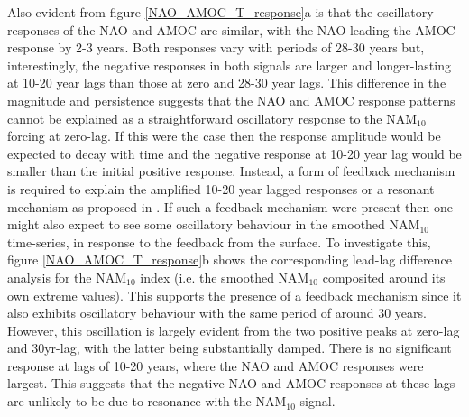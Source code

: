 Also evident from figure \ref{NAO_AMOC_T_response}a is that the oscillatory responses of the NAO and AMOC are similar, with the NAO leading the AMOC response by 2-3 years. Both responses vary with periods of 28-30 years but, interestingly, the negative responses in both signals are  larger and longer-lasting at 10-20 year lags than those at zero and 28-30 year lags. This difference in the magnitude and persistence suggests that the NAO and AMOC response patterns cannot be explained as a straightforward oscillatory response to the NAM$_{10}$ forcing at zero-lag. If this were the case then the response amplitude would be expected to decay with time and the negative response at 10-20 year lag would be smaller than the initial positive response. Instead, a form of feedback mechanism is required to explain the amplified 10-20 year lagged responses or a resonant mechanism as proposed in \cite{reichlerStratospheric2012}. If such a feedback mechanism were present then one might also expect to see some oscillatory behaviour in the smoothed NAM$_{10}$ time-series, in response to the feedback from the surface. To investigate this, figure \ref{NAO_AMOC_T_response}b shows the corresponding lead-lag difference analysis for the NAM$_{10}$ index (i.e. the smoothed NAM$_{10}$ composited around its own extreme values). This supports the presence of a feedback mechanism since it also exhibits oscillatory behaviour with the same period of around 30 years. However, this oscillation is largely evident from the two positive peaks at zero-lag and 30yr-lag, with the latter being substantially damped. There is no significant response at lags of 10-20 years, where the NAO and AMOC responses were largest. This suggests that the negative NAO and AMOC responses at these lags are unlikely to be due to resonance with the NAM$_{10}$ signal. 

